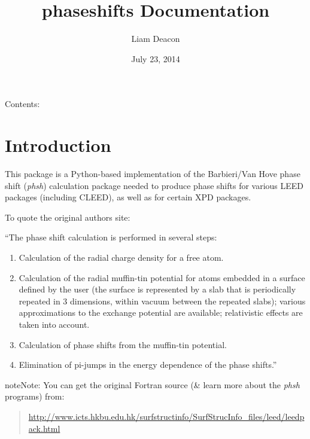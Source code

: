 \documentclass[letterpaper,10pt,english]{sphinxmanual}
\title{phaseshifts Documentation}
\date{July 23, 2014}
\author{Liam Deacon}
\begin{document}
\maketitle
\tableofcontents
{}\label{index::doc}


Contents:


\chapter{Introduction}
\label{introduction:welcome-to-phaseshifts-s-documentation}\label{introduction:introduction}\label{introduction::doc}\label{introduction:id1}
This package is a Python-based implementation of the Barbieri/Van Hove
phase shift (\emph{phsh}) calculation package needed to produce phase shifts for
various LEED packages (including CLEED), as well as for certain XPD packages.

To quote the original authors site:

``The phase shift calculation is performed in several steps:
\begin{enumerate}
\item {} 
Calculation of the radial charge density for a free atom.

\item {} 
Calculation of the radial muffin-tin potential for atoms embedded in a
surface defined by the user (the surface is represented by a slab that
is periodically repeated in 3 dimensions, within vacuum between the
repeated slabs); various approximations to the exchange potential
are available; relativistic effects are taken into account.

\item {} 
Calculation of phase shifts from the muffin-tin potential.

\item {} 
Elimination of pi-jumps in the energy dependence of the phase shifts.''

\end{enumerate}

\begin{notice}{note}{Note:}
You can get the original Fortran source
(\& learn more about the \emph{phsh} programs) from:
\begin{quote}

\href{http://www.icts.hkbu.edu.hk/surfstructinfo/SurfStrucInfo\_files/leed/leedpack.html}{http://www.icts.hkbu.edu.hk/surfstructinfo/SurfStrucInfo\_files/leed/leedpack.html}
\end{quote}
\end{notice}
\end{document}
